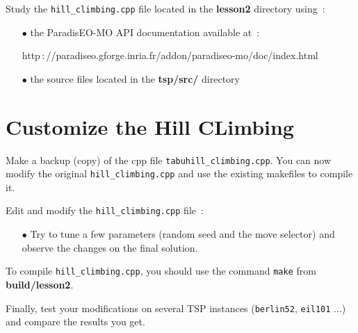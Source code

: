 \documentclass[a4paper]{article}
\begin{document}
    Study the {\tt hill\_climbing.cpp} file located in the {\bf lesson2} directory
    using~:
    \begin{itemize}
       \item[$\bullet$] the ParadisEO-MO API documentation available at~:

       \hspace{1cm}http$\,:$//paradiseo.gforge.inria.fr/addon/paradiseo-mo/doc/index.html
       \item[$\bullet$] the source files located in the {\bf tsp/src/} directory
    \end{itemize}

\section{Customize the Hill CLimbing}

   Make a backup (copy) of the cpp file {\tt tabuhill\_climbing.cpp}. You can now modify the
   original {\tt hill\_climbing.cpp} and use the existing makefiles to compile it.

     Edit and modify the {\tt hill\_climbing.cpp} file~:
    \begin{itemize}
       \item[$\bullet$] Try to tune a few parameters (random seed
       and the move selector) and observe the changes on the final
       solution.

    \end{itemize}

    \smallskip
    To compile {\tt hill\_climbing.cpp}, you should use the
    command {\tt make} from {\bf build/lesson2}.

    \medskip
    Finally, test your modifications on several TSP instances ({\tt berlin52},
    {\tt eil101} ...) and compare the results you get.
\end{document}
